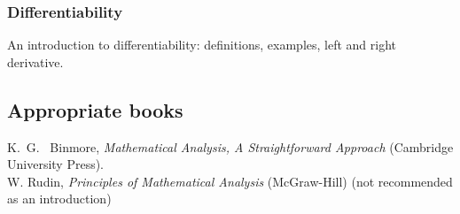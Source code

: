 \documentclass[twoside]{scrartcl}
\begin{document}
{\subsubsection*{Differentiability} An introduction to differentiability: definitions, examples, left and right derivative.

\subsection*{Appropriate books}

{\shortskip

K.~G.~ Binmore, \textit{Mathematical Analysis, A Straightforward Approach} (Cambridge University Press).\\

W. Rudin, \textit{Principles of Mathematical Analysis} (McGraw-Hill) (not recommended as an introduction)  
}



}





\TableofContents

\end{document}
